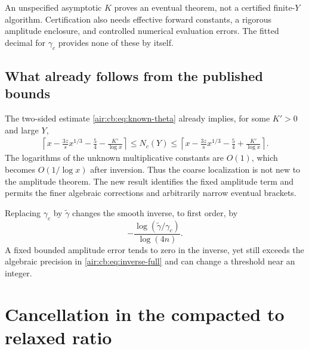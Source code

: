 \documentclass[11pt,letterpaper]{article}
\numberwithin{equation}{section}
\theoremstyle{remark}
\begin{document}
An unspecified asymptotic $K$ proves an eventual theorem, not a certified
finite-$Y$ algorithm. Certification also needs effective forward constants,
a rigorous amplitude enclosure, and controlled numerical evaluation errors.
The fitted decimal for $\gamma_c$ provides none of these by itself.

\subsection{What already follows from the published bounds}
The two-sided estimate \eqref{air:cb:eq:known-theta} already implies, for some
$K'>0$ and large $Y$,
\begin{equation}\label{air:cb:eq:coarse-threshold}
\begin{aligned}
\left\lceil x-\frac{3z}{s}x^{1/3}-\frac54-\frac{K'}{\log x}\right\rceil
\le N_c(Y)\le
\left\lceil x-\frac{3z}{s}x^{1/3}-\frac54+\frac{K'}{\log x}\right\rceil.
\end{aligned}
\end{equation}
The logarithms of the unknown multiplicative constants are $O(1)$,
which becomes $O(1/\log x)$ after inversion. Thus the coarse localization
is not new to the amplitude theorem. The new result identifies the fixed
amplitude term and permits the finer algebraic corrections and arbitrarily
narrow eventual brackets.

Replacing $\gamma_c$ by $\widetilde\gamma$ changes the smooth inverse,
to first order, by
\[
-\frac{\log(\widetilde\gamma/\gamma_c)}{\log(4n)}.
\]
A fixed bounded amplitude error tends to zero in the inverse, yet still
exceeds the algebraic precision in \eqref{air:cb:eq:inverse-full} and can change a
threshold near an integer.

\section{Cancellation in the compacted to relaxed ratio}\label{air:cb:sec:ratio}
\end{document}
